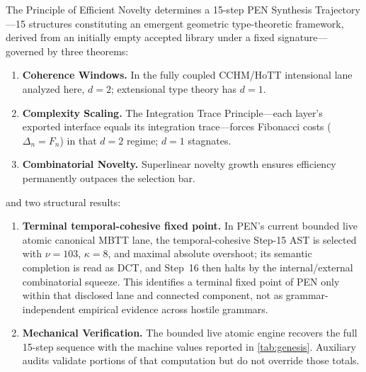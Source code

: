 \documentclass[11pt,a4paper]{article}
\theoremstyle{plain}
\theoremstyle{definition}
\theoremstyle{remark}
\begin{document}
The Principle of Efficient Novelty determines a 15-step PEN Synthesis Trajectory---15 structures constituting an emergent geometric type-theoretic framework, derived from an initially empty accepted library under a fixed signature---governed by three theorems:
\begin{enumerate}[nosep]
    \item \textbf{Coherence Windows.} In the fully coupled CCHM/HoTT intensional lane analyzed here, $d = 2$; extensional type theory has $d = 1$.
    \item \textbf{Complexity Scaling.} The Integration Trace Principle---each layer's exported interface equals its integration trace---forces Fibonacci costs ($\Delta_n = F_n$) in that $d = 2$ regime; $d = 1$ stagnates.
    \item \textbf{Combinatorial Novelty.} Superlinear novelty growth ensures efficiency permanently outpaces the selection bar.
\end{enumerate}
and two structural results:
\begin{enumerate}[nosep, start=4]
    \item \textbf{Terminal temporal-cohesive fixed point.} In PEN's current bounded live atomic canonical MBTT lane, the temporal-cohesive Step-15 AST is selected with $\nu=103$, $\kappa=8$, and maximal absolute overshoot; its semantic completion is read as DCT, and Step~16 then halts by the internal/external combinatorial squeeze.
    This identifies a terminal fixed point of PEN only within that disclosed lane and connected component, not as grammar-independent empirical evidence across hostile grammars.
    \item \textbf{Mechanical Verification.} The bounded live atomic engine recovers the full 15-step sequence with the machine values reported in \cref{tab:genesis}. Auxiliary audits validate portions of that computation but do not override those totals.
\end{enumerate}
\end{document}
